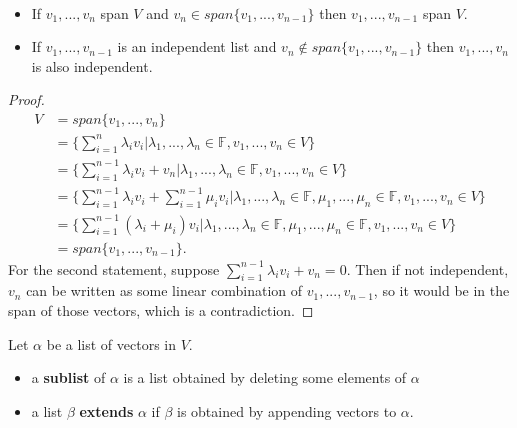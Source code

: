 \begin{prop} $ $

  \begin{itemize}
    \item If $v_1,...,v_n$ span $V$ and $v_n \in span\{v_1,...,v_{n-1}\}$ then $v_1,...,v_{n-1}$ span $V$.
    \item If $v_1,...,v_{n-1}$ is an independent list and $v_n \not \in span\{v_1,...,v_{n-1}\}$ then $v_1,...,v_n$ is also independent.
  \end{itemize}
    
\end{prop}
\begin{proof}
  \begin{align*}
    V &= span \{v_1,...,v_n\} \\ &= \{ \sum_{ i = 1}^{n} \lambda_i v_i | \lambda_1,..., \lambda_n \in \mathbb{F}, v_1,...,v_n \in V\} \\
    &= \{ \sum_{ i = 1}^{n - 1} \lambda_i v_i + v_n | \lambda_1,..., \lambda_n \in \mathbb{F}, v_1,...,v_n \in V\} \\
    &= \{ \sum_{ i = 1}^{n - 1} \lambda_i v_i + \sum_{ i = 1}^{n - 1} \mu_i v_i | \lambda_1,..., \lambda_n \in \mathbb{F}, \mu_1,..., \mu_n \in \mathbb{F}, v_1,...,v_n \in V\} \\
    &= \{ \sum_{ i = 1}^{n - 1} (\lambda_i + \mu_i) v_i | \lambda_1,..., \lambda_n \in \mathbb{F}, \mu_1,..., \mu_n \in \mathbb{F}, v_1,...,v_n \in V\} \\
    &= span \{v_1, ..., v_{n-1}\}
  .\end{align*}
  For the second statement, suppose $\sum_{ i = 1}^{n-1} \lambda_i v_i + v_n = 0$. Then if not independent, $v_n$ can be written as some linear combination of $v_1,...,v_{n-1}$, so it would be in the span of those vectors, which is a contradiction.
\end{proof}

\begin{definition}
    Let $\alpha$ be a list of vectors in $V$.

    \begin{itemize}
      \item a {\bf sublist} of $\alpha$ is a list obtained by deleting some elements of $\alpha$
      \item a list $\beta$ {\bf extends} $\alpha$ if $\beta$ is obtained by appending vectors to $\alpha$.
    \end{itemize}
\end{definition}

